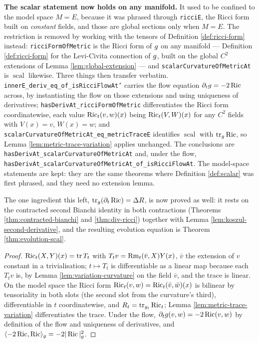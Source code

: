 \begin{lemma}
  \textbf{The scalar statement now holds on any manifold.} It used to be
  confined to the model space $M = E$, because it was phrased through
  \texttt{ricciE}, the Ricci form built on \emph{constant} fields, and those
  are global sections only when $M = E$. The restriction is removed by working
  with the tensors of Definition \ref{def:ricci-form} instead:
  \texttt{ricciFormOfMetric} is the Ricci form of $g$ on any manifold ---
  Definition \ref{def:ricci-form} for the Levi-Civita connection of $g$,
  built on the global $C^2$ extensions of Lemma \ref{lem:global-extension} ---
  and \texttt{scalarCurvatureOfMetricAt} is $\operatorname{scal}$ likewise.
  Three things then transfer verbatim.
  \texttt{innerE\_deriv\_eq\_of\_isRicciFlowAt'} carries the flow equation
  $\partial_t g = -2\operatorname{Ric}$ across, by instantiating the flow on those
  extensions and using uniqueness of derivatives;
  \texttt{hasDerivAt\_ricciFormOfMetric} differentiates the Ricci form
  coordinatewise, each value $\operatorname{Ric}_t(v,w)(x)$ being $\operatorname{Ric}_t(V,W)(x)$ for any
  $C^2$ fields with $V(x) = v$, $W(x) = w$; and
  \texttt{scalarCurvatureOfMetricAt\_eq\_metricTraceE} identifies
  $\operatorname{scal}$ with $\operatorname{tr}_g \operatorname{Ric}$, so Lemma
  \ref{lem:metric-trace-variation} applies unchanged. The conclusions are
  \texttt{hasDerivAt\_scalarCurvatureOfMetricAt} and, under the flow,
  \texttt{hasDerivAt\_scalarCurvatureOfMetricAt\_of\_isRicciFlowAt}. The
  model-space statements are kept: they are the same theorems where Definition
  \ref{def:scalar} was first phrased, and they need no extension lemma.

  The one ingredient this left, $\operatorname{tr}_g(\partial_t\operatorname{Ric}) =
  \Delta R$, is now proved as well: it rests on the contracted second Bianchi
  identity in both contractions (Theorems \ref{thm:contracted-bianchi} and
  \ref{thm:div-ricci}) together with Lemma
  \ref{lem:koszul-second-derivative}, and the resulting evolution equation is
  Theorem \ref{thm:evolution-scal}.
\end{lemma}

\begin{proof}
  \leanok
  $\operatorname{Ric}_t(X,Y)(x) = \operatorname{tr} T_t$ with $T_t v = \operatorname{Rm}_t(\bar v, X)Y(x)$,
  $\bar v$ the extension of $v$ constant in a trivialisation; $t \mapsto T_t$
  is differentiable as a linear map because each $T_t v$ is, by Lemma
  \ref{lem:variation-curvature} on the field $\bar v$, and the trace is linear.
  On the model space the Ricci form $\operatorname{Ric}_t(v,w) = \operatorname{Ric}_t(\bar v, \bar w)(x)$
  is bilinear by tensoriality in both slots (the second slot from the
  curvature's third), differentiable in $t$ coordinatewise, and $R_t =
  \operatorname{tr}_{g_t} \operatorname{Ric}_t$; Lemma \ref{lem:metric-trace-variation}
  differentiates the trace. Under the flow, $\partial_t g(v,w) = -2\operatorname{Ric}(v,w)$
  by definition of the flow and uniqueness of derivatives, and
  $\langle -2\operatorname{Ric}, \operatorname{Ric}\rangle_g = -2|\operatorname{Ric}|^2_g$.
\end{proof}


